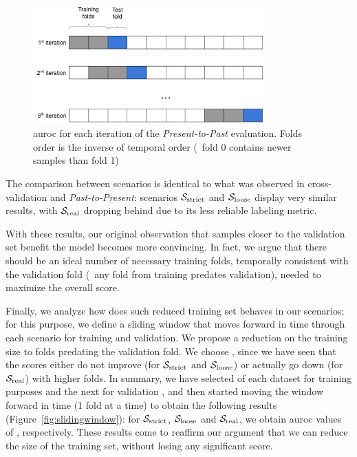 \begin{figure}[!h]
	\centering
	\includegraphics[width=0.8\textwidth]{Figures/dia_slidingwindow.png}
	\caption[Single layer results for static features in \textit{Present-to-Past}.]{\gls{auroc} for each iteration of the \textit{Present-to-Past} evaluation. Folds order is the inverse of temporal order (\ie\ fold 0 contains newer samples than fold 1)}
	\label{fig:presentpast}
\end{figure}

The comparison between scenarios is identical to what was observed in cross-validation and \textit{Past-to-Present}: scenarios $\mathcal{S}_{\mathrm{strict}}$ and $\mathcal{S}_{\mathrm{loose}}$ display very similar results, with $\mathcal{S}_{\mathrm{real}}$ dropping behind due to its less reliable labeling metric.

With these results, our original observation that samples closer to the validation set benefit the model becomes more convincing. In fact, we argue that there should be an ideal number of necessary training folds, temporally consistent with the validation fold (\ie\ any fold from training predates validation), needed to maximize the overall score.

\medskip

Finally, we analyze how does such reduced training set behaves in our scenarios; for this purpose, we define a sliding window that moves forward in time through each scenario for training and validation.
We propose a reduction on the training size to  folds predating the validation fold. We choose , since we have seen that the scores either do not improve (for $\mathcal{S}_{\mathrm{strict}}$ and $\mathcal{S}_{\mathrm{loose}}$) or actually go down (for $\mathcal{S}_{\mathrm{real}}$) with higher folds.
In summary, we have selected  of each dataset for training purposes and the next  for validation , and then started moving the window forward in time (1 fold at a time) to obtain the following results (Figure~\ref{fig:slidingwindow}): for  $\mathcal{S}_{\mathrm{strict}}$, $\mathcal{S}_{\mathrm{loose}}$ and $\mathcal{S}_{\mathrm{real}}$, we obtain \gls{auroc} values of , respectively. 
These results come to reaffirm our argument that we can reduce the size of the training set, without losing any significant score.

